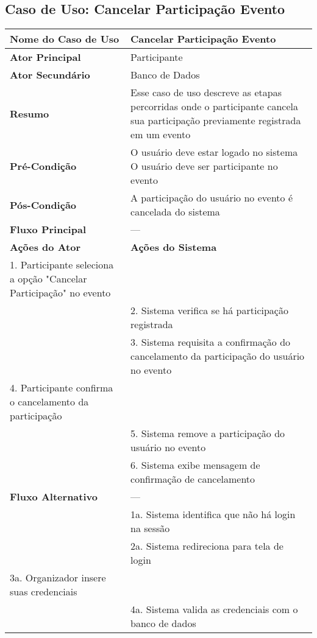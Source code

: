 \documentclass[12pt,a4paper]{article}
\begin{document}
\vspace{1cm}

\newpage

\subsection{Caso de Uso: Cancelar Participação Evento}
\begin{longtable}{|p{4cm}|p{11cm}|}
\hline
\textbf{Nome do Caso de Uso} & Cancelar Participação Evento \\ \hline
\textbf{Ator Principal} & Participante \\ \hline
\textbf{Ator Secundário} & Banco de Dados \\ \hline
\textbf{Resumo} & Esse caso de uso descreve as etapas percorridas onde o participante cancela sua participação previamente registrada em um evento \\ \hline
\textbf{Pré-Condição} & O usuário deve estar logado no sistema \newline O usuário deve ser participante no evento \\ \hline
\textbf{Pós-Condição} & A participação do usuário no evento é cancelada do sistema \\ \hline
\textbf{Fluxo Principal} & --- \\ \hline
\textbf{Ações do Ator} & \textbf{Ações do Sistema} \\ \hline
1. Participante seleciona a opção "Cancelar Participação" no evento & \\ \hline
& 2. Sistema verifica se há participação registrada \\ \hline
& 3. Sistema requisita a confirmação do cancelamento da participação do usuário no evento \\ \hline
4. Participante confirma o cancelamento da participação & \\ \hline
& 5. Sistema remove a participação do usuário no evento \\ \hline
& 6. Sistema exibe mensagem de confirmação de cancelamento \\ \hline
\textbf{Fluxo Alternativo} & --- \\ \hline
& 1a. Sistema identifica que não há login na sessão \\ \hline
& 2a. Sistema redireciona para tela de login \\ \hline
3a. Organizador insere suas credenciais & \\ \hline
& 4a. Sistema valida as credenciais com o banco de dados \\ \hline

\end{longtable}
\end{document}
